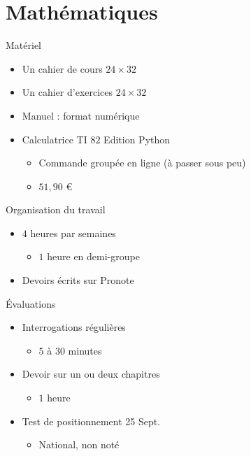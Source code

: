 \documentclass[17pt,xcolor=x11names]{beamer}
\begin{document}
\section{Mathématiques}
\begin{frame}{Matériel}
  \begin{itemize}
    \item Un cahier de cours $24\times32$
    \item Un cahier d'exercices $24\times32$
    \item Manuel : format numérique
    \item Calculatrice TI $82$ Edition Python
      \begin{itemize}
        \item Commande groupée en ligne (à passer sous peu)
        \item $51,90$ €
      \end{itemize}
  \end{itemize}
\end{frame}

\begin{frame}{Organisation du travail}
  \begin{itemize}
    \item $4$ heures par semaines
      \begin{itemize}
        \item $1$ heure en demi-groupe
      \end{itemize}
    \item Devoirs écrits sur Pronote
  \end{itemize}
\end{frame}

\begin{frame}{Évaluations}
  \begin{itemize}
    \item Interrogations régulières
      \begin{itemize}
        \item $5$ à $30$ minutes
      \end{itemize}
    \item Devoir sur un ou deux chapitres
      \begin{itemize}
        \item $1$ heure
      \end{itemize}
    \item Test de positionnement 25 Sept.
      \begin{itemize}
        \item National, non noté
      \end{itemize}
  \end{itemize}
\end{frame}
\end{document}
